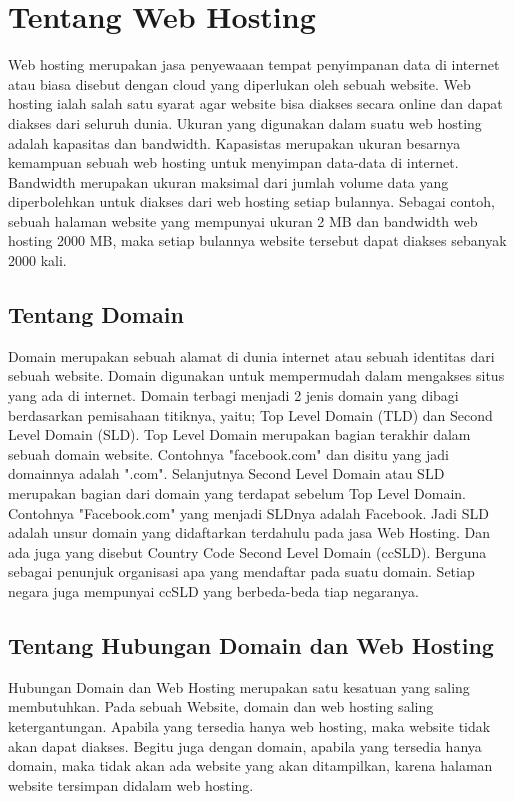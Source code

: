 \section{Tentang Web Hosting}
Web hosting merupakan jasa penyewaaan tempat penyimpanan data di internet atau biasa disebut dengan cloud
yang diperlukan oleh sebuah website. Web hosting ialah salah satu syarat agar website bisa diakses secara 
online dan dapat diakses dari seluruh dunia. Ukuran yang digunakan dalam suatu web hosting adalah kapasitas
dan bandwidth.  Kapasistas merupakan ukuran besarnya kemampuan sebuah web hosting untuk menyimpan data-data di internet.
Bandwidth merupakan ukuran maksimal dari jumlah volume data yang diperbolehkan untuk diakses dari web hosting
setiap bulannya. Sebagai contoh, sebuah halaman website yang mempunyai ukuran 2 MB dan bandwidth web hosting
2000 MB, maka setiap bulannya website tersebut dapat diakses sebanyak 2000 kali.

\subsection{Tentang Domain}
Domain merupakan sebuah alamat di dunia internet atau sebuah identitas dari sebuah website. Domain digunakan untuk mempermudah dalam mengakses situs yang ada di internet. Domain terbagi menjadi 2 jenis domain yang dibagi berdasarkan pemisahaan titiknya, yaitu; Top Level Domain (TLD) dan Second Level Domain (SLD). Top Level Domain merupakan bagian terakhir dalam sebuah domain website. Contohnya "facebook.com" dan disitu yang jadi domainnya adalah ".com". Selanjutnya Second Level Domain atau SLD merupakan bagian dari domain yang terdapat sebelum Top Level Domain. Contohnya "Facebook.com" yang menjadi SLDnya adalah Facebook. Jadi SLD adalah unsur domain yang didaftarkan terdahulu pada jasa Web Hosting. Dan ada juga yang disebut Country Code Second Level Domain (ccSLD). Berguna sebagai penunjuk organisasi apa yang mendaftar pada suatu domain. Setiap negara juga mempunyai ccSLD yang berbeda-beda tiap negaranya.

\subsection{Tentang Hubungan Domain dan Web Hosting}
Hubungan Domain dan Web Hosting merupakan satu kesatuan yang saling membutuhkan.
Pada sebuah Website, domain dan web hosting saling ketergantungan. Apabila yang tersedia hanya web hosting, maka website tidak akan dapat diakses. Begitu juga dengan domain, apabila yang tersedia hanya domain, maka tidak akan ada website yang akan ditampilkan, karena halaman website tersimpan didalam web hosting.

